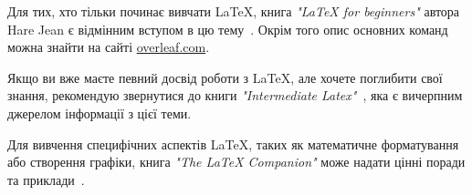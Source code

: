 	Для тих, хто тільки починає вивчати LaTeX, книга \textit{"LaTeX for beginners"} автора Hare Jean є відмінним вступом в цю тему~\cite{latexbegin}. Окрім того опис основних команд можна знайти на сайті \href{https://www.overleaf.com/learn}{overleaf.com}.
	
	Якщо ви вже маєте певний досвід роботи з LaTeX, але хочете поглибити свої знання, рекомендую звернутися до книги \textit{"Intermediate Latex"}~\cite{latexintermid}, яка є вичерпним джерелом інформації з цієї теми.
	
	Для вивчення специфічних аспектів LaTeX, таких як математичне форматування або створення графіки, книга \textit{"The LaTeX Companion"} може надати цінні поради та приклади~\cite{latexguide}.
	
	\newpage
	
	
	     
	\newpage
	\appendix
	
